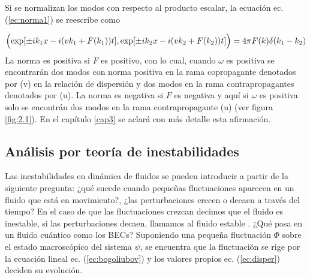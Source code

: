 Si se normalizan los modos con respecto al producto escalar, la ecuaci\'{o}n ec. (\ref{ec:norma1}) se reescribe como

\begin{align}\label{ec:norma}
\Bigl(\exp[\pm ik_1x-i(vk_1+F(k_1))t],\exp[\pm ik_2 x-i(vk_2+F(k_2))t]\Bigr)=4\pi F(k)\delta(k_1-k_2)
\end{align}
La norma es positiva si $F$ es positivo, con lo cual, cuando $\omega$ es positiva se encontrar\'{a}n dos modos con norma positiva en la rama copropagante denotados por (v) en la relaci\'{o}n de dispersi\'{o}n y dos modos en la rama contrapropagantes denotados por (u). La norma es negativa si $F$ es negativa y aqu\'{i} si $\omega$ es positiva solo se encontr\'{a}n dos modos en la rama contrapropagante (u) (ver figura \ref{fig:2.1}). En el cap\'{i}tulo \ref{cap3} se aclar\'{a} con m\'{a}s detalle esta afirmaci\'{o}n.
\subsection{An\'{a}lisis por teor\'{i}a de inestabilidades}\label{sec:Inestabilidad}
Las inestabilidades en dinámica de fluidos se pueden introducir a partir de la siguiente pregunta: ¿qué sucede cuando peque\~{n}as fluctuaciones aparecen en un fluido que est\'{a} en movimiento?, ¿las perturbaciones crecen o decaen a trav\'{e}s del tiempo? En el caso de que las fluctuaciones crezcan decimos que el fluido es inestable, si las perturbaciones decaen, llamamos al fluido estable \citep{koschmieder1977instabilities}. ¿Qu\'{e} pasa en un fluido cu\'{a}ntico como los BECs? Suponiendo una pequeña fluctuaci\'{o}n $\Phi$ sobre el estado macrosc\'{o}pico del sistema $\psi$, se encuentra que la fluctuaci\'{o}n  se rige por la ecuaci\'{o}n lineal ec. (\ref{ec:bogoliubov}) y los valores propios ec. (\ref{ec:disper}) deciden su evoluci\'{o}n.\\

